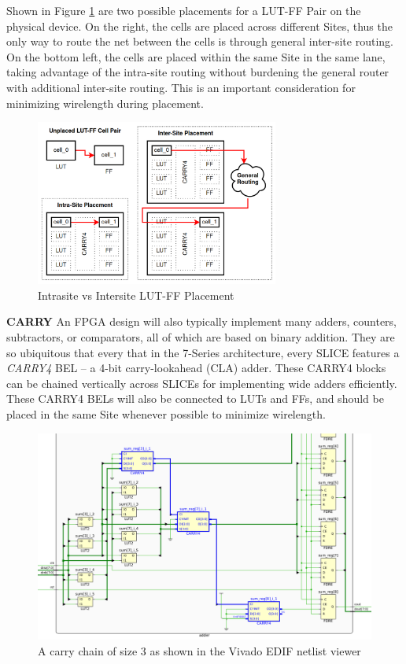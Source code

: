 \documentclass[twocolumn]{article}
\begin{document}
        Shown in Figure \ref{fig:intersite_intrasite} are two possible placements for a LUT-FF Pair on the physical device. 
        On the right, the cells are placed across different Sites, thus the only way to route the net between the cells is through general inter-site routing. 
        On the bottom left, the cells are placed within the same Site in the same lane, taking advantage of the intra-site routing without burdening the general router with additional inter-site routing. 
        This is an important consideration for minimizing wirelength during placement. 

        \begin{figure}[]
            \centering
            \includegraphics[width=8.0cm]{figures/intersite_intrasite_2.png}
            \caption{Intrasite vs Intersite LUT-FF Placement}
            \label{fig:intersite_intrasite}
        \end{figure}


    \textbf{CARRY} \quad
        An FPGA design will also typically implement many adders, counters, subtractors, or comparators, all of which are based on binary addition. 
        They are so ubiquitous that every that in the 7-Series architecture, every SLICE features a \emph{CARRY4} BEL -- a 4-bit carry-lookahead (CLA) adder. 
        These CARRY4 blocks can be chained vertically across SLICEs for implementing wide adders efficiently. 
        These CARRY4 BELs will also be connected to LUTs and FFs, and should be placed in the same Site whenever possible to minimize wirelength. 
        \begin{figure}[]
            \centering
            \includegraphics[width=16.0cm]{figures/carry_chain_edif_3.png}
            \caption{A carry chain of size 3 as shown in the Vivado EDIF netlist viewer}
            \label{fig:carry_chain_edif}
        \end{figure}
        
\end{document}
